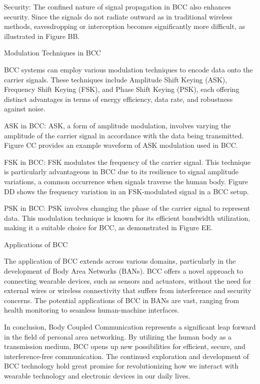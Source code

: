 Security: The confined nature of signal propagation in BCC also enhances security. Since the signals do not radiate outward as in traditional wireless methods, eavesdropping or interception becomes significantly more difficult, as illustrated in Figure BB.

Modulation Techniques in BCC

BCC systems can employ various modulation techniques to encode data onto the carrier signals. These techniques include Amplitude Shift Keying (ASK), Frequency Shift Keying (FSK), and Phase Shift Keying (PSK), each offering distinct advantages in terms of energy efficiency, data rate, and robustness against noise.

ASK in BCC: ASK, a form of amplitude modulation, involves varying the amplitude of the carrier signal in accordance with the data being transmitted. Figure CC provides an example waveform of ASK modulation used in BCC.

FSK in BCC: FSK modulates the frequency of the carrier signal. This technique is particularly advantageous in BCC due to its resilience to signal amplitude variations, a common occurrence when signals traverse the human body. Figure DD shows the frequency variation in an FSK-modulated signal in a BCC setup.

PSK in BCC: PSK involves changing the phase of the carrier signal to represent data. This modulation technique is known for its efficient bandwidth utilization, making it a suitable choice for BCC, as demonstrated in Figure EE.

Applications of BCC

The application of BCC extends across various domains, particularly in the development of Body Area Networks (BANs). BCC offers a novel approach to connecting wearable devices, such as sensors and actuators, without the need for external wires or wireless connectivity that suffers from interference and security concerns. The potential applications of BCC in BANs are vast, ranging from health monitoring to seamless human-machine interfaces.

In conclusion, Body Coupled Communication represents a significant leap forward in the field of personal area networking. By utilizing the human body as a transmission medium, BCC opens up new possibilities for efficient, secure, and interference-free communication. The continued exploration and development of BCC technology hold great promise for revolutionizing how we interact with wearable technology and electronic devices in our daily lives.



